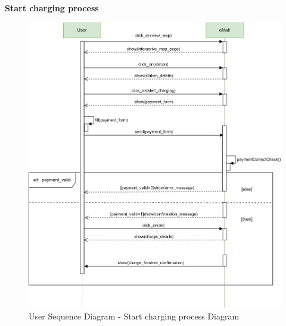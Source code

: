 \documentclass[table, 12pt]{article} %
\begin{document}
\begin{itemize}
            \newpage
            \textbf{Start charging process}
            \begin{center}
                \begin{figure}[H]
                    \includegraphics[scale=0.55, center]{assets/sequenceDiagrams/Start charging process.png}
                    \caption{User Sequence Diagram - Start charging process Diagram}
                    \label{fig: Start charging process}
                \end{figure}
            \end{center}


\end{itemize}
\end{document}
